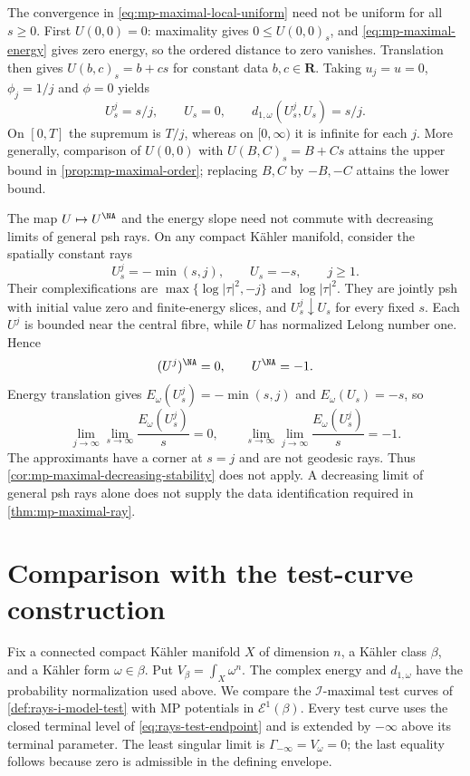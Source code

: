 \begin{example}\label{ex:mp-maximal-time-uniformity}
The convergence in \eqref{eq:mp-maximal-local-uniform} need not be uniform for all $s\geq0$. First $U(0,0)=0$: maximality gives $0\leq U(0,0)_s$, and \eqref{eq:mp-maximal-energy} gives zero energy, so the ordered distance to zero vanishes. Translation then gives $U(b,c)_s=b+cs$ for constant data $b,c\in\mathbf R$. Taking $u_j=u=0$, $\phi_j=1/j$ and $\phi=0$ yields
\[
 U^j_s=s/j,\qquad U_s=0,\qquad d_{1,\omega}(U^j_s,U_s)=s/j.
\]
On $[0,T]$ the supremum is $T/j$, whereas on $[0,\infty)$ it is infinite for each $j$. More generally, comparison of $U(0,0)$ with $U(B,C)_s=B+Cs$ attains the upper bound in \cref{prop:mp-maximal-order}; replacing $B,C$ by $-B,-C$ attains the lower bound.
\end{example}

\begin{example}\label{ex:mp-ray-limit-loss}
The map $U\mapsto U^{\NA}$ and the energy slope need not commute with decreasing limits of general psh rays. On any compact K\"ahler manifold, consider the spatially constant rays
\[
 U^j_s=-\min(s,j),\qquad U_s=-s,\qquad j\geq1.
\]
Their complexifications are $\max\{\log|\tau|^2,-j\}$ and $\log|\tau|^2$. They are jointly psh with initial value zero and finite-energy slices, and $U^j_s\downarrow U_s$ for every fixed $s$. Each $U^j$ is bounded near the central fibre, while $U$ has normalized Lelong number one. Hence
\[
 (U^j)^{\NA}=0,\qquad U^{\NA}=-1.
\]
Energy translation gives $E_\omega(U^j_s)=-\min(s,j)$ and $E_\omega(U_s)=-s$, so
\[
 \lim_{j\to\infty}\lim_{s\to\infty}\frac{E_\omega(U^j_s)}s=0,
 \qquad
 \lim_{s\to\infty}\lim_{j\to\infty}\frac{E_\omega(U^j_s)}s=-1.
\]
The approximants have a corner at $s=j$ and are not geodesic rays. Thus \cref{cor:mp-maximal-decreasing-stability} does not apply. A decreasing limit of general psh rays alone does not supply the data identification required in \cref{thm:mp-maximal-ray}.
\end{example}

\section{Comparison with the test-curve construction}
\label{sec:mp-psh-test-curves}

Fix a connected compact K\"ahler manifold $X$ of dimension $n$, a K\"ahler class $\beta$, and a K\"ahler form $\omega\in\beta$. Put $V_\beta=\int_X\omega^n$. The complex energy and $d_{1,\omega}$ have the probability normalization used above. We compare the $\mathcal I$-maximal test curves of \cref{def:rays-i-model-test} with MP potentials in $\mathcal E^1(\beta)$. Every test curve uses the closed terminal level of \eqref{eq:rays-test-endpoint} and is extended by $-\infty$ above its terminal parameter. The least singular limit is $\Gamma_{-\infty}=V_\omega=0$; the last equality follows because zero is admissible in the defining envelope.

